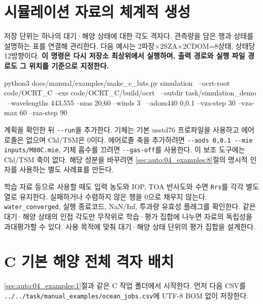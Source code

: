 \section{시뮬레이션 자료의 체계적 생성}
\label{sec:auto:04_examples:11}
저장 단위는 하나의 대기·해양 상태에 대한 각도 격자다. 관측량을 담은 행과 상태를 설명하는 표를 연결해 관리한다. 다음 예시는 2파장\ensuremath{\times}2SZA\ensuremath{\times}2CDOM=8상태, 상태당 12방향이다. \textbf{이 명령은 다시 저장소 최상위에서 실행하며, 출력 경로와 실행 파일 경로도 그 위치를 기준으로 지정한다.}


\par\noindent\begin{minipage}{\linewidth}
\begin{ManualCode}
python3 docs/manual/examples/make_c_luts.py simulation \
  --ocrt-root code/OCRT_C --exe code/OCRT_C/build/ocrt \
  --outdir task/simulation_demo \
  --wavelengths 443,555 --szas 20,60 --winds 3 \
  --adom440 0,0.1 --vza-step 30 --vza-max 60 --raa-step 90
\end{ManualCode}
\end{minipage}\par

계획을 확인한 뒤 \texttt{-\allowbreak{}-\allowbreak{}run}을 추가한다. 기체는 기본 usstd76 프로파일을 사용하고 에어로졸은 없으며 Chl/TSM은 0이다. 에어로졸 축을 추가하려면 \texttt{-\allowbreak{}-\allowbreak{}aods 0,\allowbreak{}0.\allowbreak{}1 -\allowbreak{}-\allowbreak{}mie inputs/\allowbreak{}M80C.\allowbreak{}mie}, 기체 흡수를 끄려면 \texttt{-\allowbreak{}-\allowbreak{}gas-\allowbreak{}off}를 사용한다. 이 보조 도구에는 Chl/TSM 축이 없다. 해당 성분을 바꾸려면 \ref{sec:auto:04_examples:8}절의 명시적 인자를 사용하는 별도 사례표를 만든다.

학습 자료 등으로 사용할 때도 입력 농도와 IOP, TOA 반사도와 수면 \texttt{Rrs}를 각각 별도 열로 유지한다. 실패하거나 수렴하지 않은 행을 0으로 채우지 않는다. \texttt{water\_\allowbreak{}converged}, 실행 종료코드, NaN/Inf, 투과량 유효성 플래그를 확인한다. 같은 대기·해양 상태의 인접 각도만 무작위로 학습·평가 집합에 나누면 자료의 독립성을 과대평가할 수 있다. 사용 목적에 맞춰 대기·해양 상태 단위의 평가 집합을 설계한다.

\Needspace{17\baselineskip}
\section{C 기본 해양 전체 격자 배치}
\label{sec:auto:04_examples:12}
\ref{sec:auto:04_examples:1}절과 같은 C 작업 폴더에서 시작한다. 먼저 다음 CSV를 \texttt{.\allowbreak{}.\allowbreak{}/\allowbreak{}.\allowbreak{}.\allowbreak{}/\allowbreak{}task/\allowbreak{}manual\_\allowbreak{}examples/\allowbreak{}ocean\_\allowbreak{}jobs.\allowbreak{}csv}에 UTF-8 BOM 없이 저장한다.


